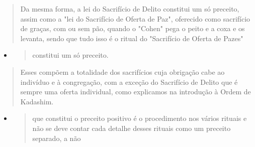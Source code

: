 \begin{quote}
Da mesma forma, a lei do Sacrifício de Delito constitui um só pre­ceito,
assim como a "lei do Sacrifício de Oferta de Paz", oferecido como
sacri­fício de graças, com ou sem pão, quando o "Cohen" pega o peito e a
coxa e os levanta, sendo que tudo isso é o ritual do "Sacrifício de
Oferta de Pazes"
\end{quote}

\begin{itemize}
\item
 \begin{quote}
 constitui um só preceito.
 \end{quote}
\end{itemize}

\begin{quote}
Esses compõem a totalidade dos sacrifícios cuja obrigação cabe ao
indivíduo e à congregação, com a exceção do Sacrifício de Delito que é
sempre uma oferta individual, como explicamos na introdução à Ordem de
Kadashim.
\end{quote}

\begin{itemize}
\item
 \begin{quote}
 que constitui o preceito positivo é o procedimento nos vários rituais
 e não se deve contar cada detalhe desses rituais como um preceito
 separado, a não
 \end{quote}
\end{itemize}

